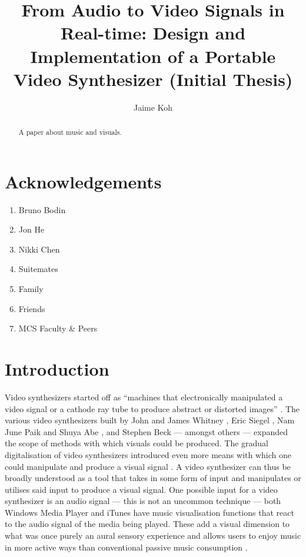 \documentclass{report}
\title{From Audio to Video Signals in Real-time: Design and Implementation of a Portable Video Synthesizer (Initial Thesis)}
\author{Jaime Koh}
\begin{document}

% 
\chapter*{Acknowledgements}
\markright{}

\begin{enumerate}
\item Bruno Bodin
\item Jon He
\item Nikki Chen
\item Suitemates
\item Family
\item Friends
\item MCS Faculty \& Peers
\end{enumerate}

\begin{abstract}
A paper about music and visuals. 
\end{abstract}

\newpage
\tableofcontents
\newpage

\chapter{Introduction}
Video synthesizers started off as ``machines that electronically manipulated a video signal or a cathode ray tube to produce abstract or distorted images'' \cite{Collopy2014}. The various video synthesizers built by John and James Whitney \cite{Patterson2009}, Eric Siegel \cite{ElectronicArtsIntermix}, Nam June Paik and Shuya Abe \cite{Furlong1983}, and Stephen Beck \cite{Beck1992} --- amongst others --- expanded the scope of methods with which visuals could be produced. The gradual digitalisation of video synthesizers introduced even more means with which one could manipulate and produce a visual signal \cite{Collopy2014}. A video synthesizer can thus be broadly understood as a tool that takes in some form of input and manipulates or utilises said input to produce a visual signal. One possible input for a video synthesizer is an audio signal --- this is not an uncommon technique --- both Windows Media Player and iTunes have music visualisation functions that react to the audio signal of the media being played. These add a visual dimension to what was once purely an aural sensory experience and allows users to enjoy music in more active ways than conventional passive music consumption \cite{Casey2008}. \par
\end{document}
